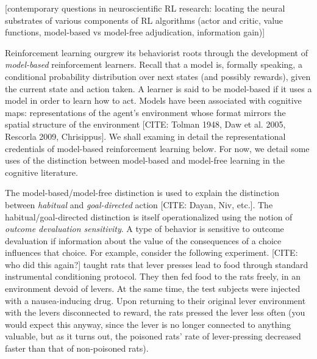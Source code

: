 [contemporary questions in neuroscientific RL research: locating the neural substrates of various components of RL algorithms (actor and critic, value functions, model-based vs model-free adjudication, information gain)]

Reinforcement learning ourgrew its behaviorist roots through the development of \emph{model-based} reinforcement learners.
Recall that a model is, formally speaking, a conditional probability distribution over next states (and possibly rewards), given the current state and action taken.
A learner is said to be model-based if it uses a model in order to learn how to act.
Models have been associated with cognitive maps: representations of the agent's environment whose format mirrors the spatial structure of the environment [CITE: Tolman 1948, Daw et al. 2005, Rescorla 2009, Chrisippus].
We shall examing in detail the representational credentials of model-based reinforcement learning below.
For now, we detail some uses of the distinction between model-based and model-free learning in the cognitive literature.

The model-based/model-free distinction is used to explain the distinction between \emph{habitual} and \emph{goal-directed} action [CITE: Dayan, Niv, etc.].
The habitual/goal-directed distinction is itself operationalized using the notion of \emph{outcome devaluation sensitivity}.
A type of behavior is sensitive to outcome devaluation if information about the value of the consequences of a choice influences that choice.
For example, consider the following experiment.
[CITE: who did this again?] taught rats that lever presses lead to food through standard instrumental conditioning protocol.
They then fed food to the rats freely, in an environment devoid of levers.
At the same time, the test subjects were injected with a nausea-inducing drug.
Upon returning to their original lever environment with the levers disconnected to reward, the rats pressed the lever less often (you would expect this anyway, since the lever is no longer connected to anything valuable, but as it turns out, the poisoned rats' rate of lever-pressing decreased faster than that of non-poisoned rats).

